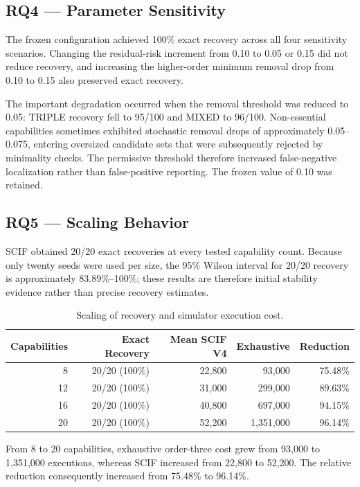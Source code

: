 \subsection{RQ4 --- Parameter Sensitivity}

The frozen configuration achieved 100\% exact recovery across all four sensitivity scenarios. Changing the residual-risk increment from 0.10 to 0.05 or 0.15 did not reduce recovery, and increasing the higher-order minimum removal drop from 0.10 to 0.15 also preserved exact recovery.

The important degradation occurred when the removal threshold was reduced to 0.05: TRIPLE recovery fell to 95/100 and MIXED to 96/100. Non-essential capabilities sometimes exhibited stochastic removal drops of approximately 0.05--0.075, entering oversized candidate sets that were subsequently rejected by minimality checks. The permissive threshold therefore increased false-negative localization rather than false-positive reporting. The frozen value of 0.10 was retained.

\subsection{RQ5 --- Scaling Behavior}

SCIF obtained 20/20 exact recoveries at every tested capability count. Because only twenty seeds were used per size, the 95\% Wilson interval for 20/20 recovery is approximately 83.89\%--100\%; these results are therefore initial stability evidence rather than precise recovery estimates.

\begin{table}[t]
\caption{Scaling of recovery and simulator execution cost.}
\label{tab:scaling}
\centering
\footnotesize
\setlength{\tabcolsep}{7pt}
\begin{tabular}{rrrrr}
\toprule
Capabilities &
Exact Recovery &
Mean SCIF V4 &
Exhaustive &
Reduction \\
\midrule
8  & 20/20 (100\%) & 22,800 & 93,000    & 75.48\% \\
12 & 20/20 (100\%) & 31,000 & 299,000   & 89.63\% \\
16 & 20/20 (100\%) & 40,800 & 697,000   & 94.15\% \\
20 & 20/20 (100\%) & 52,200 & 1,351,000 & 96.14\% \\
\bottomrule
\end{tabular}
\end{table}

From 8 to 20 capabilities, exhaustive order-three cost grew from 93,000 to 1,351,000 executions, whereas SCIF increased from 22,800 to 52,200. The relative reduction consequently increased from 75.48\% to 96.14\%.

